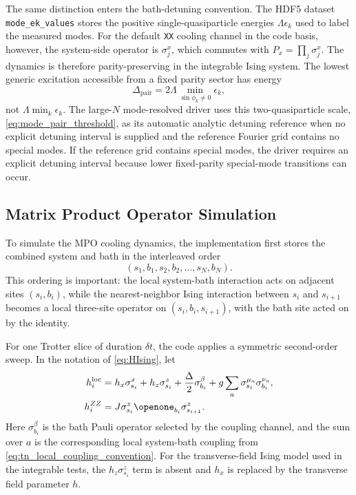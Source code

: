 \documentclass[aps,pra,twocolumn,superscriptaddress,nolongbibliography,nobalancelastpage,10pt]{revtex4-2}
\begin{document}
The same distinction enters the bath-detuning convention.  The HDF5 dataset
\texttt{mode\_ek\_values} stores the positive single-quasiparticle energies
$\Lambda\epsilon_k$ used to label the measured modes.  For the default
\texttt{XX} cooling channel in the code basis, however, the system-side
operator is $\sigma^x_j$, which commutes with
$P_x=\prod_j\sigma^x_j$.  The dynamics is therefore parity-preserving in the
integrable Ising system.  The lowest generic excitation accessible from a fixed
parity sector has energy
\begin{equation}
	\label{eq:mode_pair_threshold}
	\Delta_{\mathrm{pair}}
	=2\Lambda \min_{\sin\phi_k\neq 0}\epsilon_k ,
\end{equation}
not $\Lambda\min_k\epsilon_k$.  The large-\(N\) mode-resolved driver uses this
two-quasiparticle scale, \cref{eq:mode_pair_threshold}, as its automatic
analytic detuning reference when no explicit detuning interval is supplied and
the reference Fourier grid contains no special modes.  If the reference grid
contains special modes, the driver requires an explicit detuning interval
because lower fixed-parity special-mode transitions can occur.

\subsection{Matrix Product Operator Simulation}
\label{sec:MPOCooling}

To simulate the MPO cooling dynamics, the implementation first stores the
combined system and bath in the interleaved order
\begin{equation}
	(s_1,b_1,s_2,b_2,\ldots,s_N,b_N).
\end{equation}
This ordering is important: the local system-bath interaction acts on adjacent
sites $(s_i,b_i)$, while the nearest-neighbor Ising interaction between
$s_i$ and $s_{i+1}$ becomes a local three-site operator on
$(s_i,b_i,s_{i+1})$, with the bath site acted on by the identity.

For one Trotter slice of duration $\delta t$, the code applies a symmetric
second-order sweep.  In the notation of \cref{eq:HIsing}, let
\begin{equation}
	\begin{aligned}
		h_i^{\mathrm{loc}}
		&= h_x \sigma^x_{s_i}+h_z \sigma^z_{s_i}
		+\frac{\Delta}{2} \sigma^{\beta}_{b_i}
		+g\sum_a \sigma^{\mu_a}_{s_i}\sigma^{\nu_a}_{b_i},\\
		h_i^{ZZ}
		&=J\sigma^z_{s_i}\Id_{b_i}\sigma^z_{s_{i+1}}.
	\end{aligned}
\end{equation}
Here $\sigma^\beta_{b_i}$ is the bath Pauli operator selected by the coupling
channel, and the sum over $a$ is the corresponding local system-bath coupling
from \cref{eq:tn_local_coupling_convention}.
For the transverse-field Ising model used in the integrable tests, the
$h_z\sigma^z_{s_i}$ term is absent and $h_x$ is replaced by the transverse
field parameter $h$.
\end{document}

